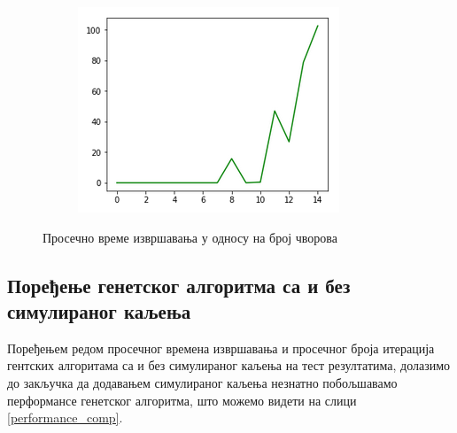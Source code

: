 \documentclass[a4paper]{article}
\begin{document}
{\begin{figure}[h!]
\begin{subfigure}{.3\textwidth}
		\centering
		\includegraphics[width=\linewidth]{images/gaa_time.png}
	\end{subfigure}
\caption{Просечно време извршавања у односу на број чворова}
\label{times}
\end{figure}

\subsection{Поређење генетског алгоритма са и без симулираног каљења}
Поређењем редом просечног времена извршавања и просечног броја итерација гентских алгоритама са и без симулираног каљења на тест резултатима, долазимо до закључка да додавањем симулираног каљења незнатно побољшавамо перформансе генетског алгоритма, што можемо видети на слици \ref{performance_comp}.

}
\end{document}
